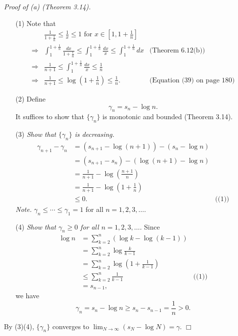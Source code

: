 \documentclass{article}
\begin{document}
\emph{Proof of (a) (Theorem 3.14).}
\begin{enumerate}
\item[(1)]
Note that
\begin{align*}
  &\frac{1}{1+\frac{1}{n}} \leq \frac{1}{x} \leq 1
    \text{ for } x \in \left[ 1,1+\frac{1}{n} \right] \\
  \Longrightarrow&
  \int_{1}^{1+\frac{1}{n}} \frac{dx}{1+\frac{1}{n}}
  \leq \int_{1}^{1+\frac{1}{n}} \frac{dx}{x}
  \leq \int_{1}^{1+\frac{1}{n}} dx
    &\text{(Theorem 6.12(b))} \\
  \Longrightarrow&
  \frac{1}{n+1}
  \leq \int_{1}^{1+\frac{1}{n}} \frac{dx}{x}
  \leq \frac{1}{n} \\
  \Longrightarrow&
  \frac{1}{n+1}
  \leq \log \left(1 + \frac{1}{n} \right)
  \leq \frac{1}{n}.
    &\text{(Equation (39) on page 180)}
\end{align*}

\item[(2)]
Define
\[
  \gamma_n = s_n - \log n.
\]
It suffices to show that $\{\gamma_n\}$ is monotonic and bounded (Theorem 3.14).

\item[(3)]
\emph{Show that $\{\gamma_n\}$ is decreasing.}
\begin{align*}
  \gamma_{n+1} - \gamma_n
  &= (s_{n+1} - \log(n+1)) - (s_n - \log n) \\
  &= (s_{n+1} - s_n) - (\log(n+1)-\log n) \\
  &= \frac{1}{n+1} - \log \left( \frac{n+1}{n} \right) \\
  &= \frac{1}{n+1} - \log \left(1 + \frac{1}{n} \right) \\
  &\leq 0.
    &\text{((1))}
\end{align*}
\emph{Note.} $\gamma_n \leq \cdots \leq \gamma_1 = 1$ for all $n=1,2,3,\ldots$.

\item[(4)]
\emph{Show that $\gamma_n \geq 0$ for all $n=1,2,3,\ldots$.}
Since
\begin{align*}
  \log n
  &= \sum_{k=2}^{n} (\log k - \log(k-1)) \\
  &= \sum_{k=2}^{n} \log \frac{k}{k-1} \\
  &= \sum_{k=2}^{n} \log \left( 1 + \frac{1}{k-1} \right) \\
  &\leq \sum_{k=2}^{n} \frac{1}{k-1}
    &\text{((1))} \\
  &= s_{n-1},
\end{align*}
we have
\[
  \gamma_n = s_n - \log n \geq s_n - s_{n-1} = \frac{1}{n} > 0.
\]
\end{enumerate}
By (3)(4), $\{\gamma_n\}$ converges to $\lim_{N \to \infty} (s_N - \log N) = \gamma$.
$\Box$ \\
\end{document}
